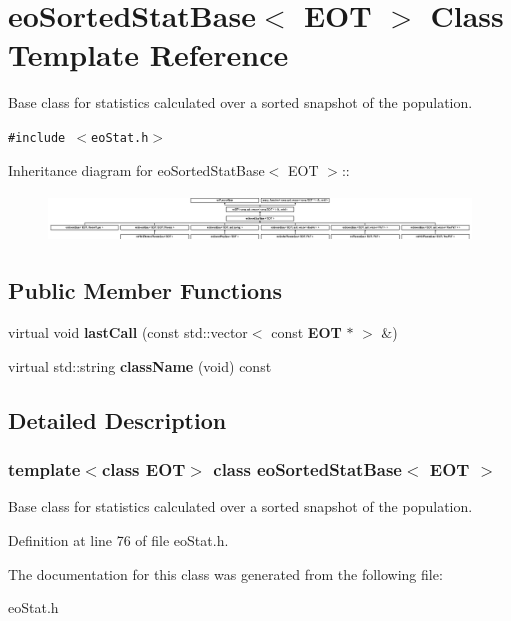 \section{eo\-Sorted\-Stat\-Base$<$ EOT $>$ Class Template Reference}
\label{classeo_sorted_stat_base}
Base class for statistics calculated over a sorted snapshot of the population.  


{\tt \#include $<$eo\-Stat.h$>$}

Inheritance diagram for eo\-Sorted\-Stat\-Base$<$ EOT $>$::\begin{figure}[H]
\begin{center}
\leavevmode
\includegraphics[height=1.27854cm]{classeo_sorted_stat_base}
\end{center}
\end{figure}
\subsection*{Public Member Functions}
\begin{CompactItemize}
\item 
virtual void {\bf last\-Call} (const std::vector$<$ const {\bf EOT} $\ast$ $>$ \&)\label{classeo_sorted_stat_base_a0}

\item 
virtual std::string {\bf class\-Name} (void) const \label{classeo_sorted_stat_base_a1}

\end{CompactItemize}


\subsection{Detailed Description}
\subsubsection*{template$<$class EOT$>$ class eo\-Sorted\-Stat\-Base$<$ EOT $>$}

Base class for statistics calculated over a sorted snapshot of the population. 



Definition at line 76 of file eo\-Stat.h.

The documentation for this class was generated from the following file:\begin{CompactItemize}
\item 
eo\-Stat.h\end{CompactItemize}
